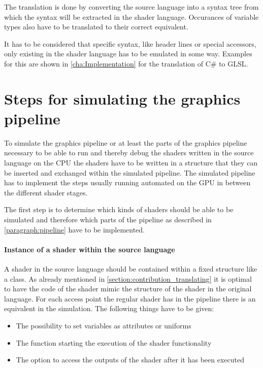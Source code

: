 The translation is done by converting the source language into a syntax tree from which the syntax will be extracted in the shader language. Occurances of variable types also have to be translated to their correct equivalent.

It has to be considered that specific syntax, like header lines or special accessors, only existing in the shader language has to be emulated in some way. Examples for this are shown in \autoref{cha:Implementation} for the translation of C\# to GLSL.

\section{Steps for simulating the graphics pipeline}
\label{section:contribution_simulating}

To simulate the graphics pipeline or at least the parts of the graphics pipeline necessary to be able to run and thereby debug the shaders written in the source language on the CPU the shaders have to be written in a structure that they can be inserted and exchanged within the simulated pipeline. The simulated pipeline has to implement the steps usually running automated on the GPU in between the different shader stages.

The first step is to determine which kinds of shaders should be able to be simulated and therefore which parts of the pipeline as described in \autoref{paragraph:pipeline} have to be implemented.

\paragraph{Instance of a shader within the source language}

A shader in the source language should be contained within a fixed structure like a class.
As already mentioned in \autoref{section:contribution_translating} it is optimal to have the code of the shader mimic the structure of the shader in the original language. For each access point the regular shader has in the pipeline there is an equivalent in the simulation. The following things have to be given:
\begin{itemize}
\item The possibility to set variables as attributes or uniforms
\item The function starting the execution of the shader functionality
\item The option to access the outputs of the shader after it has been executed
\end{itemize}

